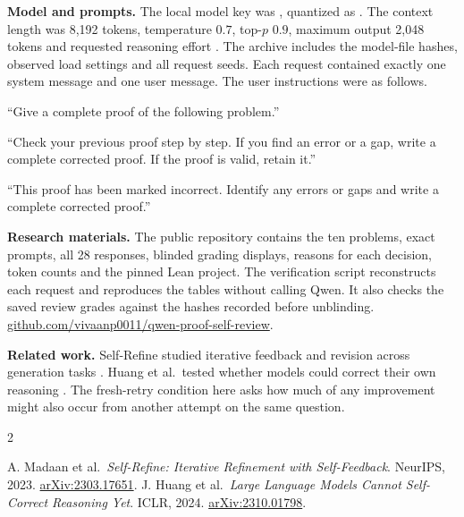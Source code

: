 \documentclass[11pt,letterpaper]{article}
\newcommand{\lead}[1]{\par\smallskip\noindent\textbf{#1}\enspace\ignorespaces}
\newcommand{\code}[1]{\texttt{\detokenize{#1}}}
\newcommand{\quoted}[1]{\textquotedblleft{}#1\textquotedblright{}}
\begin{document}
\lead{Model and prompts.}
The local model key was \code{qwen/qwen3.8-27b}, quantized as \code{Q4_K_M}.
The context length was 8,192 tokens, temperature \(0.7\), top-\(p\) \(0.9\),
maximum output 2,048 tokens and requested reasoning effort \code{none}.
The archive includes the model-file hashes, observed load settings and all
request seeds. Each request contained exactly one system message and one
user message. The user instructions were as follows.

\begin{description}\small\setlength{\itemsep}{1pt}
\item[First and fresh.] \quoted{Give a complete proof of the following problem.}
\item[Neutral.] \quoted{Check your previous proof step by step. If you find an error or a gap,
write a complete corrected proof. If the proof is valid, retain it.}
\item[Flagged.] \quoted{This proof has been marked incorrect. Identify any errors or gaps and
write a complete corrected proof.}
\end{description}

\lead{Research materials.}
The public repository contains the ten problems, exact prompts, all 28
responses, blinded grading displays, reasons for each decision, token counts
and the pinned Lean project. The verification script reconstructs each request
and reproduces the tables without calling Qwen. It also checks the saved
review grades against the hashes recorded before unblinding.
\href{https://github.com/vivaanp0011/qwen-proof-self-review}{github.com/vivaanp0011/qwen-proof-self-review}.

\lead{Related work.}
Self-Refine studied iterative feedback and revision across generation tasks
\cite{madaan}. Huang et al.\ tested whether models could correct their own
reasoning \cite{huang}. The fresh-retry condition here asks how much of any
improvement might also occur from another attempt on the same question.

\begin{thebibliography}{2}
\small\raggedright
{} A. Madaan et al.\ \emph{Self-Refine: Iterative Refinement with Self-Feedback}.
NeurIPS, 2023. \href{https://arxiv.org/abs/2303.17651}{arXiv:2303.17651}.
 J. Huang et al.\ \emph{Large Language Models Cannot Self-Correct Reasoning Yet}.
ICLR, 2024. \href{https://arxiv.org/abs/2310.01798}{arXiv:2310.01798}.
\end{thebibliography}
\end{document}
